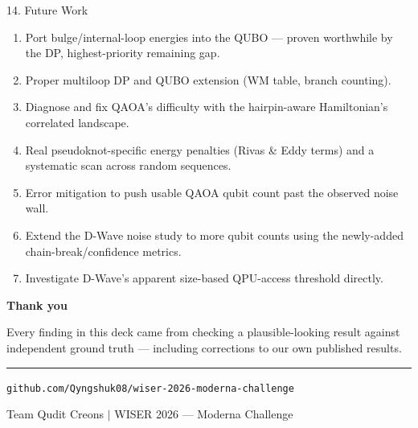 \documentclass[aspectratio=169,10pt]{beamer}
\begin{document}
\begin{frame}{14. Future Work}
  \begin{enumerate}\small
    \item Port bulge/internal-loop energies into the QUBO --- proven worthwhile by the DP, highest-priority remaining gap.
    \item Proper multiloop DP and QUBO extension (WM table, branch counting).
    \item Diagnose and fix QAOA's difficulty with the hairpin-aware Hamiltonian's correlated landscape.
    \item Real pseudoknot-specific energy penalties (Rivas \& Eddy terms) and a systematic scan across random sequences.
    \item Error mitigation to push usable QAOA qubit count past the observed noise wall.
    \item Extend the D-Wave noise study to more qubit counts using the newly-added chain-break/confidence metrics.
    \item Investigate D-Wave's apparent size-based QPU-access threshold directly.
  \end{enumerate}
\end{frame}

{
\begin{frame}[plain]
  \vspace{1.6cm}
  {\color{white}\Huge\textbf{Thank you}\par}
  \vspace{0.6cm}
  {\color{ice}\large Every finding in this deck came from checking a plausible-looking result against\\ independent ground truth --- including corrections to our own published results.\par}
  \vspace{0.6cm}
  {\color{accent}\rule{3.5cm}{1.5pt}\par}
  \vspace{0.4cm}
  {\color{white}\large \texttt{github.com/Qyngshuk08/wiser-2026-moderna-challenge}\par}
  {\color{muted}\large Team Qudit Creons \; $\vert$ \; WISER 2026 --- Moderna Challenge\par}
\end{frame}
}
\end{document}
